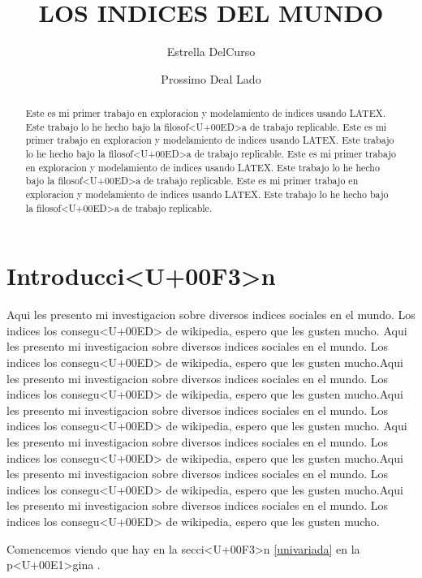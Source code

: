 \documentclass{article}
\title{LOS INDICES DEL MUNDO}
\author[1]{\normalsize Estrella DelCurso}
\author[2]{\normalsize Prossimo Deal Lado}
\affil[1,2]{\small  Escuela de Ingenier<U+00ED>a,Universidad de la vida\\
\texttt{{delcurso,deallado}@vida.edu}}
\affil[1]{\small Instituto de altas investigaciones financieras\\
Banco del Parque\\
\texttt{delcurso@bp.com}}
\date{}
\begin{document}


\maketitle


\begin{abstract}
Este es mi primer trabajo en exploracion y modelamiento de indices usando LATEX. Este trabajo lo he hecho bajo la filosof<U+00ED>a de trabajo replicable. Este es mi primer trabajo en exploracion y modelamiento de indices usando LATEX. Este trabajo lo he hecho bajo la filosof<U+00ED>a de trabajo replicable. Este es mi primer trabajo en exploracion y modelamiento de indices usando LATEX. Este trabajo lo he hecho bajo la filosof<U+00ED>a de trabajo replicable. Este es mi primer trabajo en exploracion y modelamiento de indices usando LATEX. Este trabajo lo he hecho bajo la filosof<U+00ED>a de trabajo replicable.
\end{abstract}

\section*{Introducci<U+00F3>n}

Aqui les presento mi investigacion sobre diversos indices sociales en el mundo. Los indices los consegu<U+00ED> de wikipedia, espero que les gusten mucho. Aqui les presento mi investigacion sobre diversos indices sociales en el mundo. Los indices los consegu<U+00ED> de wikipedia, espero que les gusten mucho.Aqui les presento mi investigacion sobre diversos indices sociales en el mundo. Los indices los consegu<U+00ED> de wikipedia, espero que les gusten mucho.Aqui les presento mi investigacion sobre diversos indices sociales en el mundo. Los indices los consegu<U+00ED> de wikipedia, espero que les gusten mucho.
Aqui les presento mi investigacion sobre diversos indices sociales en el mundo. Los indices los consegu<U+00ED> de wikipedia, espero que les gusten mucho.Aqui les presento mi investigacion sobre diversos indices sociales en el mundo. Los indices los consegu<U+00ED> de wikipedia, espero que les gusten mucho.Aqui les presento mi investigacion sobre diversos indices sociales en el mundo. Los indices los consegu<U+00ED> de wikipedia, espero que les gusten mucho.

Comencemos viendo que hay en la secci<U+00F3>n \ref{univariada} en la p<U+00E1>gina \pageref{univariada}.

\clearpage
\end{document}
